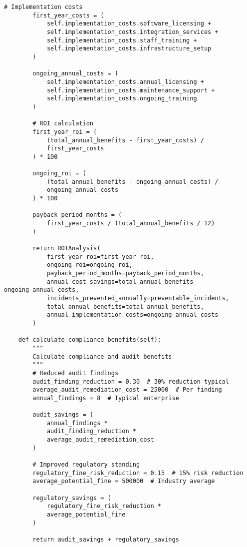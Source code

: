 \documentclass[10pt,twocolumn]{IEEEtran}
\begin{document}
\begin{lstlisting}[caption={ROI Calculation Framework}]
        # Implementation costs
        first_year_costs = (
            self.implementation_costs.software_licensing +
            self.implementation_costs.integration_services +
            self.implementation_costs.staff_training +
            self.implementation_costs.infrastructure_setup
        )
        
        ongoing_annual_costs = (
            self.implementation_costs.annual_licensing +
            self.implementation_costs.maintenance_support +
            self.implementation_costs.ongoing_training
        )
        
        # ROI calculation
        first_year_roi = (
            (total_annual_benefits - first_year_costs) / 
            first_year_costs
        ) * 100
        
        ongoing_roi = (
            (total_annual_benefits - ongoing_annual_costs) / 
            ongoing_annual_costs
        ) * 100
        
        payback_period_months = (
            first_year_costs / (total_annual_benefits / 12)
        )
        
        return ROIAnalysis(
            first_year_roi=first_year_roi,
            ongoing_roi=ongoing_roi,
            payback_period_months=payback_period_months,
            annual_cost_savings=total_annual_benefits - ongoing_annual_costs,
            incidents_prevented_annually=preventable_incidents,
            total_annual_benefits=total_annual_benefits,
            annual_implementation_costs=ongoing_annual_costs
        )
    
    def calculate_compliance_benefits(self):
        """
        Calculate compliance and audit benefits
        """
        # Reduced audit findings
        audit_finding_reduction = 0.30  # 30% reduction typical
        average_audit_remediation_cost = 25000  # Per finding
        annual_findings = 8  # Typical enterprise
        
        audit_savings = (
            annual_findings * 
            audit_finding_reduction * 
            average_audit_remediation_cost
        )
        
        # Improved regulatory standing
        regulatory_fine_risk_reduction = 0.15  # 15% risk reduction
        average_potential_fine = 500000  # Industry average
        
        regulatory_savings = (
            regulatory_fine_risk_reduction * 
            average_potential_fine
        )
        
        return audit_savings + regulatory_savings
\end{lstlisting}
\end{document}
